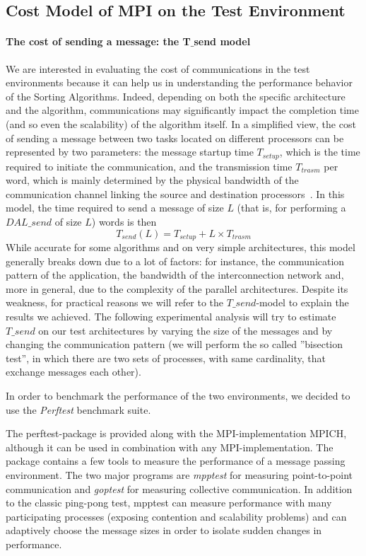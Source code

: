 \subsection{Cost Model of MPI on the Test Environment}
\label{MPI-cost-model}
\paragraph{The cost of sending a message: the T$\_$send model}
We are interested in evaluating the cost of communications in the test environments because it can help us in understanding the performance behavior of the Sorting Algorithms. Indeed, depending on both the specific architecture and the algorithm, communications may significantly impact the completion time (and so even the scalability) of the algorithm itself. In a simplified view, the cost of sending a message between two tasks located on different processors can be represented by two parameters: the message startup time $T_{setup}$, which is the time required to initiate the communication, and the transmission time $T_{trasm}$ per word, which is mainly determined by the physical bandwidth of the communication channel linking the source and destination processors~\cite{VANN}. In this model, the time required to send a message of size $L$ (that is, for performing a $DAL\_send$ of size $L$) words is then
\[
T_{send}(L) = T_{setup} + L \times T_{trasm}
\]
While accurate for some algorithms and on very simple architectures, this model generally breaks down due to a lot of factors: for instance, the communication pattern of the application, the bandwidth of the interconnection network and, more in general, due to the complexity of the parallel architectures. Despite its weakness, for practical reasons we will refer to the $T\_send$-model to explain the results we achieved.  
The following experimental analysis will try to estimate $T\_send$ on our test architectures by varying the size of the messages and by changing the communication pattern (we will perform the so called ''bisection test'', in which there are two sets of processes, with same cardinality, that exchange messages each other). 

In order to benchmark the performance of the two environments, we decided to use the \textit{Perftest} benchmark suite.

The perftest-package is provided along with the MPI-implementation MPICH, although it can be used in combination with any MPI-implementation. The package contains a few tools to measure the performance of a message passing environment. The two major programs are \textit{mpptest} for measuring point-to-point communication and \textit{goptest} for measuring collective communication. In addition to the classic ping-pong test, mpptest can measure performance with many participating processes (exposing contention and scalability problems) and can adaptively choose the message sizes in order to isolate sudden changes in performance. 

